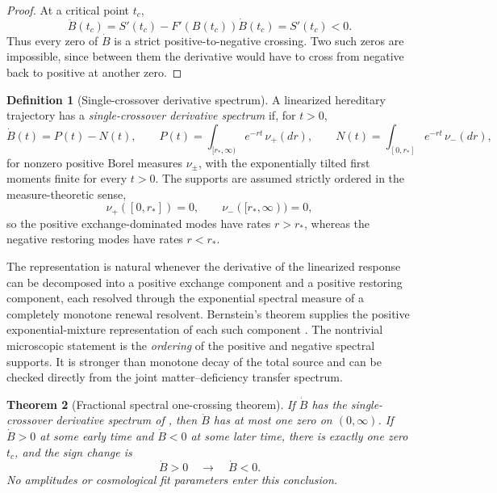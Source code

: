 \documentclass[11pt]{article}
\newtheorem{theorem}{Theorem}[section]
\theoremstyle{definition}
\newtheorem{definition}[theorem]{Definition}
\theoremstyle{remark}
\begin{document}
\begin{proof}
At a critical point \(t_c\),
\[
  \ddot B(t_c)=S'(t_c)-F'(B(t_c))\dot B(t_c)=S'(t_c)<0.
\]
Thus every zero of \(\dot B\) is a strict positive-to-negative crossing.  Two
such zeros are impossible, since between them the derivative would have to
cross from negative back to positive at another zero.
\end{proof}

\begin{definition}[Single-crossover derivative spectrum]
\label{def:single-crossover-spectrum}
A linearized hereditary trajectory has a \emph{single-crossover derivative
spectrum} if, for \(t>0\),
\[
  \dot B(t)=P(t)-N(t),
  \qquad
  P(t)=\int_{[r_*,\infty)}e^{-rt}\,\nu_+(dr),
  \qquad
  N(t)=\int_{[0,r_*]}e^{-rt}\,\nu_-(dr),
\]
for nonzero positive Borel measures \(\nu_\pm\), with the exponentially tilted
first moments finite for every \(t>0\).  The supports are assumed strictly
ordered in the measure-theoretic sense,
\[
  \nu_+([0,r_*])=0,
  \qquad
  \nu_-([r_*,\infty))=0,
\]
so the positive exchange-dominated modes have rates \(r>r_*\), whereas the
negative restoring modes have rates \(r<r_*\).
\end{definition}

The representation is natural whenever the derivative of the linearized response
can be decomposed into a positive exchange component and a positive restoring
component, each resolved through the exponential spectral measure of a completely
monotone renewal resolvent.  Bernstein's theorem supplies the positive
exponential-mixture representation of each such component
\cite{SchillingSongVondracek}.  The nontrivial microscopic statement is the
\emph{ordering} of the positive and negative spectral supports.  It is stronger
than monotone decay of the total source and can be checked directly from the
joint matter--deficiency transfer spectrum.

\begin{theorem}[Fractional spectral one-crossing theorem]
\label{thm:fractional-one-crossing}
If \(\dot B\) has the single-crossover derivative spectrum of
, then \(\dot B\) has at most one zero on
\((0,\infty)\).  If \(\dot B>0\) at some early time and \(\dot B<0\) at some
later time, there is exactly one zero \(t_c\), and the sign change is
\[
  \dot B>0\quad\longrightarrow\quad\dot B<0.
\]
No amplitudes or cosmological fit parameters enter this conclusion.
\end{theorem}
\end{document}
